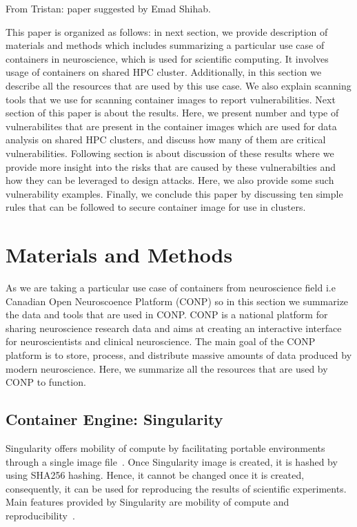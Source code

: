 \documentclass[a4paper,num-refs]{oup-contemporary}
\newcommand{\TG}[1]{\color{blue}From Tristan: #1\color{black}}
\begin{document}
\TG{paper suggested by Emad Shihab.}

This paper is organized as follows: in next section, we provide description
of materials and methods which includes summarizing a particular use case of
containers in neuroscience, which is used for scientific computing. It involves
usage of containers on shared HPC cluster. Additionally, in this section we
describe all the resources that are used by this use case. We also explain
scanning tools that we use for scanning container images to report
vulnerabilities. Next section of this paper is about the results. Here, we
present number and type of vulnerabilites that are present in the container images
which are used for data analysis on shared HPC clusters, and discuss how many of them are
critical vulnerabilities. Following section is about discussion of these results
where we provide more insight into the risks that are caused by these vulnerabilties
and how they can be leveraged to design attacks. Here, we also provide some such
vulnerability examples. Finally, we conclude this paper by discussing ten simple
rules that can be followed to secure container image for use in clusters.

\section{Materials and Methods}

As we are taking a particular use case of containers from
neuroscience field i.e Canadian Open Neuroscoence Platform (CONP) so  
in this section we summarize the data and tools 
that are used in CONP. CONP is a national platform for sharing neuroscience
research data and aims at creating an interactive interface for neuroscientists and
clinical neuroscience. The main goal of the CONP platform is to store, process, and
distribute massive amounts of data produced by modern neuroscience.
Here, we summarize all the resources that are
used by CONP to function.


\subsection{Container Engine: Singularity}

Singularity offers mobility of compute by facilitating portable environments 
through a single image file~\cite{kurtzer2016singularity}. Once Singularity image
is created, it is hashed by using SHA256 hashing. Hence, it cannot be changed
once it is created, consequently, it can be used for reproducing the results of
scientific experiments. Main features provided by
Singularity are mobility of compute and reproducibility~\cite{kurtzer2017singularity}.
\end{document}
